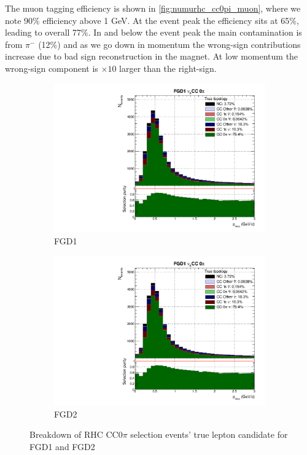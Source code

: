 The muon tagging efficiency is shown in \autoref{fig:numurhc_cc0pi_muon}, where we note 90\% efficiency above 1 GeV. At the event peak the efficiency sits at 65\%, leading to overall 77\%. In and below the event peak the main contamination is from $\pi^-$ (12\%) and as we go down in momentum the wrong-sign contributions increase due to bad sign reconstruction in the magnet. At low momentum the wrong-sign component is $\times10$ larger than the right-sign.
\begin{figure}[h]
	\begin{subfigure}[t]{0.49\textwidth}
		\includegraphics[width=\textwidth,page=26, trim={0mm 0mm 0mm 9mm}, clip]{figures/mach3/2018/Selection/2018_FullNoRedNDmatrix_rebin_verbose_may_diagnostics}
		\caption{FGD1}
	\end{subfigure}
	\begin{subfigure}[t]{0.49\textwidth}
		\includegraphics[width=\textwidth,page=32, trim={0mm 0mm 0mm 9mm}, clip]{figures/mach3/2018/Selection/2018_FullNoRedNDmatrix_rebin_verbose_may_diagnostics}
		\caption{FGD2}
	\end{subfigure}
	\caption{Breakdown of \numu RHC CC0$\pi$ selection events' true lepton candidate for FGD1 and FGD2}
	\label{fig:numurhc_cc0pi_muon}
\end{figure}

